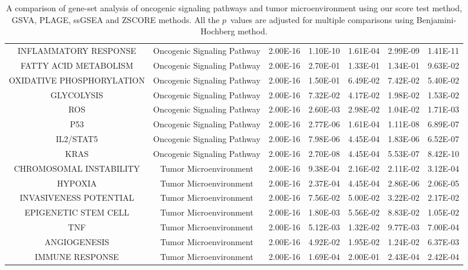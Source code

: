 \documentclass[hidelinks,11pt]{article}
\begin{document}
\begin{table}[ht]
\begin{center}
{\begin{tabular}{| c | c | c | c | c | c | c |}
INFLAMMATORY RESPONSE & Oncogenic Signaling Pathway & 2.00E-16 & 1.10E-10 & 1.61E-04 & 2.99E-09 & 1.41E-11 \\
FATTY ACID METABOLISM & Oncogenic Signaling Pathway & 2.00E-16 & 2.70E-01 & 1.33E-01 & 1.34E-01 & 9.63E-02 \\
OXIDATIVE PHOSPHORYLATION & Oncogenic Signaling Pathway & 2.00E-16 & 1.50E-01 & 6.49E-02 & 7.42E-02 & 5.40E-02 \\
GLYCOLYSIS & Oncogenic Signaling Pathway & 2.00E-16 & 7.32E-02 & 4.17E-02 & 1.98E-02 & 1.53E-02 \\
ROS & Oncogenic Signaling Pathway & 2.00E-16 & 2.60E-03 & 2.98E-02 & 1.04E-02 & 1.71E-03 \\
P53 & Oncogenic Signaling Pathway & 2.00E-16 & 2.77E-06 & 1.61E-04 & 1.11E-08 & 6.89E-07 \\
IL2/STAT5 & Oncogenic Signaling Pathway & 2.00E-16 & 7.98E-06 & 4.45E-04 & 1.83E-06 & 6.52E-07 \\
KRAS & Oncogenic Signaling Pathway & 2.00E-16 & 2.70E-08 & 4.45E-04 & 5.53E-07 & 8.42E-10 \\
CHROMOSOMAL INSTABILITY & Tumor Microenvironment & 2.00E-16 & 9.38E-04 & 2.16E-02 & 2.11E-02 & 3.12E-04 \\
HYPOXIA & Tumor Microenvironment & 2.00E-16 & 2.37E-04 & 4.45E-04 & 2.86E-06 & 2.06E-05 \\
INVASIVENESS POTENTIAL & Tumor Microenvironment & 2.00E-16 & 7.56E-02 & 5.00E-02 & 3.22E-02 & 2.17E-02 \\
EPIGENETIC STEM CELL & Tumor Microenvironment & 2.00E-16 & 1.80E-03 & 5.56E-02 & 8.83E-02 & 1.05E-02 \\
TNF & Tumor Microenvironment & 2.00E-16 & 5.12E-03 & 1.32E-02 & 9.77E-03 & 7.00E-04 \\
ANGIOGENESIS & Tumor Microenvironment & 2.00E-16 & 4.92E-02 & 1.95E-02 & 1.24E-02 & 6.37E-03 \\
IMMUNE RESPONSE & Tumor Microenvironment & 2.00E-16 & 1.69E-04 & 2.00E-01 & 2.43E-04 & 2.42E-04 \\
\hline
\end{tabular}
}
\label{table:design}
\end{center}
\caption{A comparison of gene-set analysis of oncogenic signaling pathways and tumor microenvironment using our score test method, GSVA, PLAGE, ssGSEA and ZSCORE methods. All the $p$~values are adjusted for multiple comparisons using Benjamini-Hochberg method. }
\end{table} 
\end{document}
